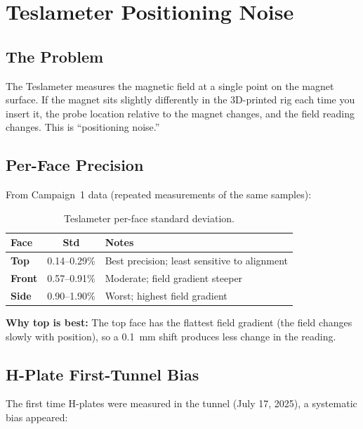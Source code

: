 \documentclass[11pt,letterpaper]{article}
\begin{document}
\section{Teslameter Positioning Noise}
\label{sec:positioning}

\subsection{The Problem}

The Teslameter measures the magnetic field at a single point on the magnet
surface. If the magnet sits slightly differently in the 3D-printed rig each time
you insert it, the probe location relative to the magnet changes, and the field
reading changes. This is ``positioning noise.''

\subsection{Per-Face Precision}

From Campaign~1 data (repeated measurements of the same samples):

\begin{table}[htbp]
\centering
\caption{Teslameter per-face standard deviation.}
\label{tab:positioning}
\begin{tabular}{@{}lcp{7cm}@{}}
\toprule
Face & Std & Notes \\
\midrule
\textbf{Top}   & 0.14--0.29\% & Best precision; least sensitive to alignment \\
\textbf{Front} & 0.57--0.91\% & Moderate; field gradient steeper \\
\textbf{Side}  & 0.90--1.90\% & Worst; highest field gradient \\
\bottomrule
\end{tabular}
\end{table}

\textbf{Why top is best:} The top face has the flattest field gradient (the
field changes slowly with position), so a \SI{0.1}{\milli\meter} shift produces
less change in the reading.

\subsection{H-Plate First-Tunnel Bias}

The first time H-plates were measured in the tunnel (July 17, 2025), a
systematic bias appeared:
\end{document}
